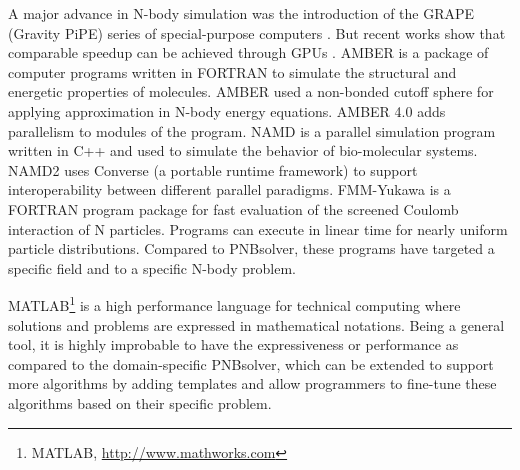 \documentclass[draftclsnofoot]{elsarticle}
\begin{document}
A  major advance in N-body simulation  was the introduction of the GRAPE (Gravity PiPE) series of special-purpose computers \cite{grape}.
But recent works show that comparable speedup can be achieved through GPUs \cite{grapegpu}. 
AMBER \cite{pearlman} is a package  of computer programs written in FORTRAN to simulate  the structural  and energetic
properties  of molecules. AMBER used a non-bonded cutoff sphere for applying approximation in  N-body energy equations. AMBER 4.0 
adds parallelism to modules of the program. NAMD \cite{kale} is a parallel simulation program written in C++ and used 
to simulate the behavior of bio-molecular systems. NAMD2 uses Converse (a portable runtime framework) to support interoperability 
between different parallel paradigms. FMM-Yukawa \cite{ jhuang} is a FORTRAN program package for fast evaluation of the screened 
Coulomb interaction of N particles. Programs can execute in linear time for nearly uniform particle distributions. Compared to 
PNBsolver, these programs have targeted a specific field and to a specific N-body problem.

MATLAB\footnote{MATLAB, \url{http://www.mathworks.com}} is a high performance language for technical computing where solutions and problems are
expressed in mathematical notations. Being a general tool, it is highly improbable to have the expressiveness or performance as compared
to the domain-specific PNBsolver, which can be extended to support more algorithms by adding templates and allow programmers to fine-tune
these algorithms based on their specific problem. 
\end{document}
